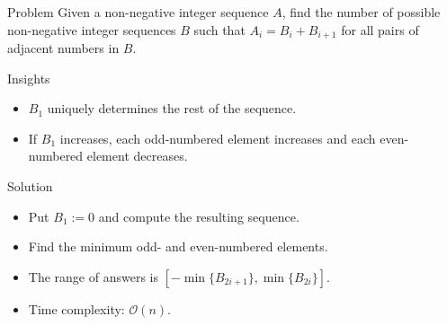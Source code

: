 \begin{slide}
	\begin{block}{Problem}
		Given a non-negative integer sequence $A$, find the number of possible non-negative integer sequences $B$ such that $A_i = B_i + B_{i+1}$ for all pairs of adjacent numbers in $B$.
	\end{block}
	\pause
	\begin{block}{Insights}
		\begin{itemize}
			\item $B_1$ uniquely determines the rest of the sequence.
      \item If $B_1$ increases, each odd-numbered element increases
        and each even-numbered element decreases.
    \end{itemize}
	\end{block}
	\pause
  \begin{block}{Solution}
		\begin{itemize}
			\item Put $B_1 := 0$ and compute the resulting sequence.
      \item Find the minimum odd- and even-numbered elements.
			\item The range of answers is $[-\min\{B_{2i+1}\}, \min\{B_{2i}\}]$.
      \item Time complexity: $\mathcal{O}(n)$.
		\end{itemize}
	\end{block}
\end{slide}
